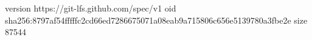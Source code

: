 version https://git-lfs.github.com/spec/v1
oid sha256:8797af54fffffc2cd66ed7286675071a08eab9a715806c656e5139780a3fbe2e
size 87544
